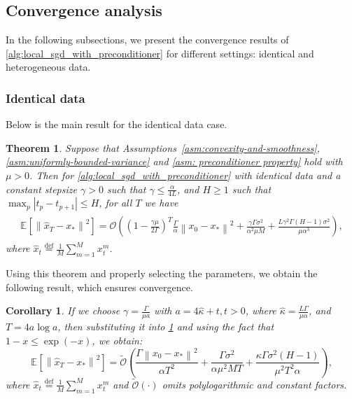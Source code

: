 \documentclass[sn-mathphys,Numbered]{sn-jnl}%
\newtheorem{theorem}{Theorem}
\newtheorem{corollary}{Corollary}
\renewcommand{\|}{\parallel}
\newcommand\ec[2][]{\ensuremath{\mathbb{E}_{#1} \left[#2\right]}}
\newcommand\ecn[3][]{\ec[#1]{\norm{#2}^2_{#3}}}
\newcommand\br[1]{\left ( #1 \right )}
\newcommand{\norm}[1]{\left\lVert#1\right\rVert}
\newcommand{\sqn}[1]{{\left\lVert#1\right\rVert}^2}
\newcommand{\abs}[1]{\left\lvert#1\right\rvert}
\newcommand{\eqdef}{\overset{\text{def}}{=}}
\newcommand{\avemm}{\frac{1}{M}\sum\limits_{m=1}^M}
\renewcommand {\*} {\ast}
\begin{document}
\subsection{Convergence analysis}
\label{conv-analysis}
In the following subsections, we present the convergence results of  \cref{alg:local_sgd_with_preconditioner} for different settings: identical and heterogeneous data.
\subsubsection{Identical data}
Below is the main result for the identical data case.
\begin{theorem}
    \label{thm:ident_convergence_theorem}
    Suppose that Assumptions~\ref{asm:convexity-and-smoothness}, \ref{asm:uniformly-bounded-variance} and \ref{asm: preconditioner property} hold with $\mu > 0$. Then for \cref{alg:local_sgd_with_preconditioner} with identical data and a constant stepsize $\gamma > 0$ such that $\gamma \leq \frac{\alpha}{4L}$, and $H \geq 1$ such that $\max_{p} \abs{t_p - t_{p+1}} \leq H$, for all $T$ we have
     \begin{align*}
         \begin{split}
          \ecn{\hat{x}_T - x_\ast}{} = \mathcal{O}\left( \left(1 - \frac{\gamma\mu}{2\Gamma} \right)^{T}\frac{\Gamma}{\alpha} \sqn{x_0 - x_\ast} + \frac{\gamma \Gamma \sigma^2}{\alpha^2\mu M} + \frac{ L \gamma^2 \Gamma \br{H - 1} \sigma^2}{\mu\alpha^3}\right),
         \end{split}
     \end{align*}
      where $\hat{x}_t \eqdef \avemm x_t^m$.
\end{theorem} 
Using this theorem and properly selecting the parameters, we obtain the following result, which ensures convergence.
\begin{corollary}
    \label{clr:identical_convergence}
    If we choose $\gamma = \frac{\Gamma}{\mu a}$ with $a = 4\hat{\kappa} + t, t > 0$, where $\hat{\kappa} = \frac{L\Gamma}{\mu \alpha}$, and $T = 4a\log a$, then 
    substituting it into \cref{thm:ident_convergence_theorem} 
 and using the fact that $1 - x \leq \exp{(-x)}$, we obtain:
    \begin{equation*}
        \ecn{\hat{x}_T - x_\ast}{} = \tilde{\mathcal{O}} \br{ \frac{\Gamma\sqn{x_0 - x_\ast}}{\alpha T^2} + \frac{\Gamma \sigma^2}{\alpha \mu^2 M T} + \frac{\kappa \Gamma \sigma^2 (H-1)}{\mu^2 T^2 \alpha}},
     \end{equation*}
     where $\hat{x}_t \eqdef \avemm x_t^m$ and $\tilde{\mathcal{O}} (\cdot)$ omits polylogarithmic and constant factors.
\end{corollary}
\end{document}
